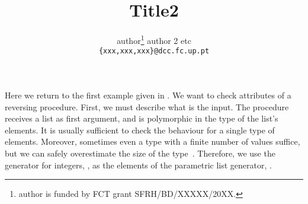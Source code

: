 \documentclass[11pt,twoside]{article}
\makeatletter
\def\cleardoublepage{\clearpage\if@twoside \ifodd\c@page\else%
\hbox{}%
\thispagestyle{empty}
\newpage%
\if@twocolumn\hbox{}\newpage\fi\fi\fi}
\makeatother
\begin{document}


\mkcoverpage

\title{Title2}
\author{author\thanks{author is funded by FCT grant
SFRH/BD/XXXXX/20XX.}\hspace{0.5cm} author 2 \hspace{0.5cm}
etc\\ {\tt \{xxx,xxx,xxx\}@dcc.fc.up.pt}}

\date{}
\cleardoublepage

\maketitle


Here we return to the first example given in .
%
%
%
We want to check attributes of a reversing procedure.
%
First, we must describe what is the input.
%
The procedure receives a list as first argument, and is polymorphic in
the type of the list's elements.
It is usually sufficient to check the behaviour for a
single type of elements.
%
Moreover, sometimes even a type with a finite number of values suffice,
but we can safely overestimate the size of the
type~\cite{Bernardy-testing-poly-prop}.
%
%
Therefore, we use the generator for integers, , as the elements
of the parametric list generator, .
\end{document}
